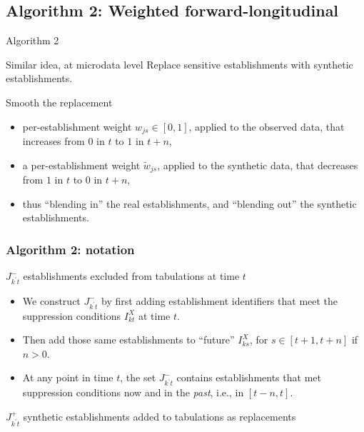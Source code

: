 \subsection{Algorithm 2: Weighted forward-longitudinal}

\begin{frame}{Algorithm 2}
\begin{block}{Similar idea, at microdata level}
Replace sensitive establishments with synthetic establishments.
\end{block}
\begin{block}{Smooth the replacement}
\begin{itemize}

\item per-establishment weight $w_{js} \in [0,1]$, applied to the observed data, that increases from 
$0$ in $t$ to $1$ in $t+n$, 
\item a per-establishment weight $\tilde{w}_{js}$, applied to the synthetic data, that decreases 
from $1$ in $t$ to $0$ in 
$t+n$, 
\item thus ``blending in''  the real establishments, and ``blending out'' the synthetic 
establishments.
	
\end{itemize}
\end{block}
\end{frame}

\begin{frame}
	\frametitle{Algorithm 2: notation}
\begin{block}{$J_{k^\prime t}^-$ establishments excluded from tabulations at time $t$} 
\begin{itemize}
	\item 	We construct $J_{k^\prime t}^-$ by first adding establishment identifiers that meet the suppression conditions $I^X_{kt}$ at time $t$. 
	\item Then  add 
	those same establishments to ``future''  $I^X_{ks}$, for $s \in [t+1,t+n]$ if $n>0$. 
	\item At any
	point in time $t$, the set $J_{k^\prime t}^-$ contains establishments that met suppression 
	conditions now and in the \textit{past}, i.e.,   in $[t-n,t]$.   
	 
\end{itemize}
\end{block}
\pause
\begin{block}{$J_{k^\prime t}^+$ synthetic establishments}
 added to  
 tabulations as replacements
\end{block}
\end{frame}

